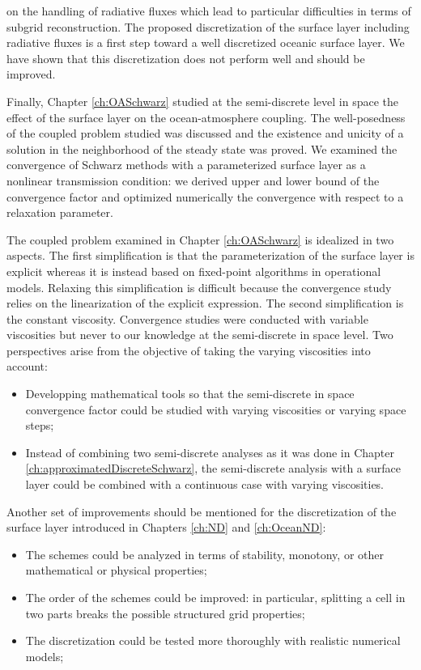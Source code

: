 on the handling of radiative fluxes which lead to particular
difficulties in terms of subgrid reconstruction. The proposed
discretization of the surface layer including radiative fluxes
is a first step toward a well discretized oceanic surface layer.
We have shown that this discretization does not perform well
and should be improved.
\par
Finally, Chapter \ref{ch:OASchwarz} studied at the semi-discrete
level in space the effect of the surface layer on the
ocean-atmosphere coupling.
The well-posedness of the coupled problem studied was discussed
and the existence and unicity of a solution in the neighborhood
of the steady state was proved.
We examined the convergence of Schwarz methods with a parameterized
surface layer as a nonlinear transmission condition:
we derived upper and lower bound of the convergence factor and
optimized numerically the convergence with respect to a relaxation
parameter.
\par
The coupled problem examined in Chapter
\ref{ch:OASchwarz} is idealized in two aspects. The first
simplification is that
the parameterization of the surface layer is explicit whereas
it is instead based on fixed-point algorithms in operational models.
Relaxing this simplification is difficult because the convergence
study relies on the linearization of the explicit expression.
The second simplification is the constant viscosity.
Convergence studies were conducted with variable viscosities but
never to our knowledge at the semi-discrete in space level.
Two perspectives arise from the objective of taking the
varying viscosities into account:
\begin{itemize}
	\item Developping mathematical tools so that the
		semi-discrete in space convergence factor could
		be studied with varying viscosities or
		varying space steps;
	\item Instead of combining two semi-discrete analyses
		as it was done in
	Chapter \ref{ch:approximatedDiscreteSchwarz}, 
	the semi-discrete analysis with a surface layer
	could be combined with a continuous case with
	varying viscosities.
\end{itemize}
\par
Another set of improvements should be mentioned for the discretization
of the surface layer introduced in Chapters \ref{ch:ND} and
\ref{ch:OceanND}:
\begin{itemize}
\item The schemes could be analyzed in terms of stability, monotony,
	or other mathematical or physical properties;
\item The order of the schemes could be improved: in particular,
	splitting a cell in two parts breaks the possible structured
		grid properties;
\item The discretization could be tested more thoroughly with
	realistic numerical models;
\end{itemize}
